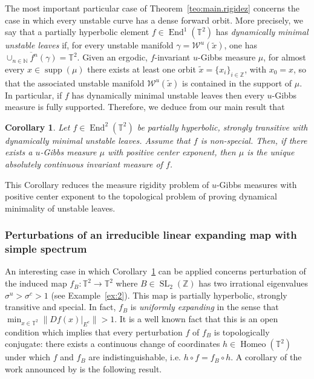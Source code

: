 \documentclass[a4paper,11pt,reqno]{amsart}
\newcommand{\Z}{{\mathbb Z}}
\newcommand{\N}{{\mathbb N}}
\newcommand{\TT}{{\mathbb{T}^2}}
\newcommand{\cW}{{\mathcal W}}
\newcommand{\tix}{\tilde{x}}
\newtheorem{corollary}{Corollary}
\theoremstyle{definition}
\begin{document}
The most important particular case of Theorem~\ref{teo:main.rigidez} concerns the case in which every unstable curve has a dense forward orbit. More precisely, we say that a partially hyperbolic element $f\in\operatorname{End}^1(\TT)$ has \emph{dynamically minimal unstable leaves} if, for every unstable manifold $\gamma=\cW^u(\tix)$, one has $\overline{\cup_{n\in\N}f^n(\gamma)}=\TT$. Given an ergodic, $f$-invariant $u$-Gibbs measure $\mu$, for almost every $x\in\operatorname{supp}(\mu)$ there exists at least one orbit $\tix=\{x_i\}_{i\in\Z}$, with $x_0=x$, so that the associated unstable manifold $\cW^u(\tix)$ is contained in the support of $\mu$. In particular, if $f$ has dynamically minimal unstable leaves then every $u$-Gibbs measure is fully supported. Therefore, we deduce from our main result that

\begin{corollary}
    \label{cor:main-dynamicallymininmal}
Let $f\in\operatorname{End}^2(\TT)$ be partially hyperbolic, strongly transitive with dynamically minimal unstable leaves. Assume that $f$ is non-special. Then, if there exists a $u$-Gibbs measure $\mu$ with positive center exponent, then $\mu$ is the unique absolutely continuous invariant measure of $f$.
\end{corollary}

This Corollary reduces the measure rigidity problem of $u$-Gibbs measures with positive center exponent to the topological problem of proving dynamical minimality of unstable leaves. 

\subsubsection{Perturbations of an irreducible linear expanding map with simple spectrum} An interesting case in which Corollary~\ref{cor:main-dynamicallymininmal} can be applied concerns perturbation of the induced map $f_B:\TT\to\TT$ where $B\in\operatorname{SL}_2(\Z)$ has two irrational eigenvalues $\sigma^u>\sigma^c>1$ (see Example~\ref{ex:2}). This map is partially hyperbolic, strongly transitive and special. In fact, $f_B$ is \emph{uniformly expanding} in the sense that $\min_{x\in\TT}\|Df(x)|_{E^c}\|>1$. It is a well known fact that this is an open condition which implies that every perturbation $f$ of $f_B$ is topologically conjugate: there exists a continuous change of coordinates $h\in\operatorname{Homeo}(\TT)$ under which $f$ and $f_B$ are indistinguishable, i.e. $h\circ f=f_B\circ h$.    
A corollary of the work announced by \cite{ACEPWZ} is the following result.
\end{document}
